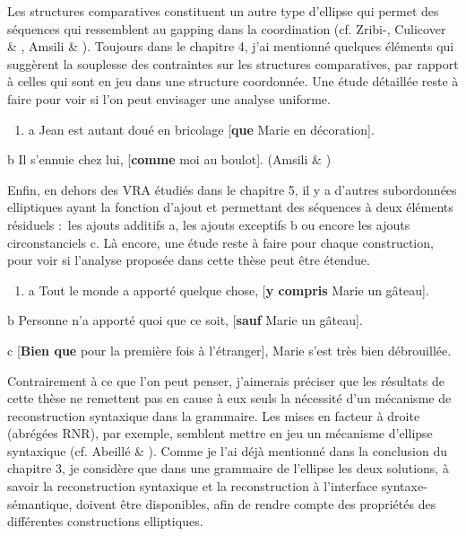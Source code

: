 Les structures comparatives  constituent un autre type d'ellipse qui permet des séquences qui ressemblent au gapping dans la coordination (cf. Zribi-\citet{Hertz1986}, Culicover \& \citet{Jackendoff2005}, Amsili \& \citet{Desmets2008}). Toujours dans le chapitre 4, j'ai mentionné quelques éléments qui suggèrent la souplesse des contraintes sur les structures comparatives, par rapport à celles qui sont en jeu dans une structure coordonnée. Une étude détaillée reste à faire pour voir si l'on peut envisager une analyse uniforme.


\begin{enumerate}
\item \label{bkm:Ref307424498}a  Jean est autant doué en bricolage [\textbf{que} Marie en décoration]. 


\end{enumerate}
  b  Il s'ennuie chez lui, [\textbf{comme} moi au boulot].    (Amsili \& \citet{Desmets2008})

Enfin, en dehors des VRA étudiés dans le chapitre 5, il y a d'autres subordonnées elliptiques ayant la fonction d'ajout et permettant des séquences à deux éléments résiduels :~les ajouts additifs a, les ajouts exceptifs b ou encore les ajouts circonstanciels c. Là encore, une étude reste à faire pour chaque construction, pour voir si l'analyse proposée dans cette thèse peut être étendue.


\begin{enumerate}
\item \label{bkm:Ref307424511}a  Tout le monde a apporté quelque chose, [\textbf{y compris} Marie un gâteau]. 


\end{enumerate}
  b  Personne n'a apporté quoi que ce soit, [\textbf{sauf} Marie un gâteau].

  c  [\textbf{Bien que} pour la première fois à l'étranger], Marie s'est très bien débrouillée.

Contrairement à ce que l'on peut penser, j'aimerais préciser que les résultats de cette thèse ne remettent pas en cause à eux seuls la nécessité d'un mécanisme de reconstruction syntaxique dans la grammaire. Les mises en facteur à droite (abrégées RNR), par exemple, semblent mettre en jeu un mécanisme d'ellipse syntaxique (cf. Abeillé \& \citet{Mouret2010}). Comme je l'ai déjà mentionné dans la conclusion du chapitre 3, je considère que dans une grammaire de l'ellipse les deux solutions, à savoir la reconstruction syntaxique et la reconstruction à l'interface syntaxe-sémantique, doivent être disponibles, afin de rendre compte des propriétés des différentes constructions elliptiques.


